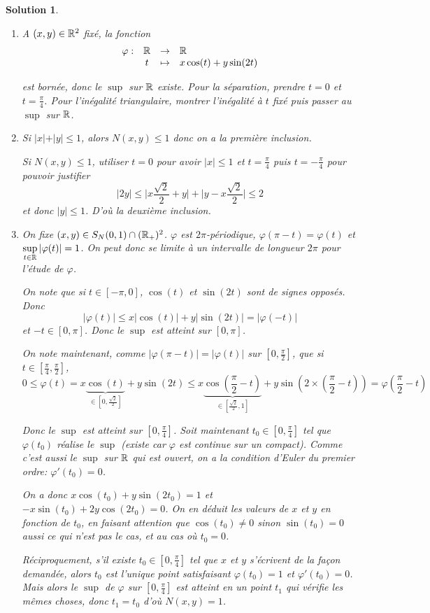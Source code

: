 \documentclass[12pt]{article}
\newtheorem{solution}{Solution}[section]
\theoremstyle{remark}
\newcommand{\function}[5]{
	$$
	\begin{array}{rccl}
		#1: & #2 & \to & #3 \\
		& #4 & \mapsto & #5
	\end{array}
	$$
}
\begin{document}
\begin{solution}
	\phantom{}
	\begin{enumerate}
		\item A $(x,y)\in\mathbb{R}^{2}$ fixé, la fonction \function{\varphi}{\R}{\R}{t}{x\cos(t)+y\sin(2t)}
		est bornée, donc le $\sup$ sur $\mathbb{R}$ existe. Pour la séparation, prendre $t=0$ et $t=\frac{\pi}{4}$. Pour l'inégalité triangulaire, montrer l'inégalité à $t$ fixé puis passer au $\sup$ sur $\mathbb{R}$.
		
		\item Si $\vert x\vert+\vert y\vert\leqslant1$, alors $N(x,y)\leqslant 1$ donc on a la première inclusion. 
		
		Si $N(x,y)\leqslant 1$, utiliser $t=0$ pour avoir $\vert x\vert\leqslant1$ et $t=\frac{\pi}{4}$ puis $t=-\frac{\pi}{4}$ pour pouvoir justifier
		$$\vert 2y\vert\leqslant \Biggl\vert x\frac{\sqrt{2}}{2}+y\Biggr\vert+\Biggl\vert y-x\frac{\sqrt{2}}{2}\Biggr\vert\leqslant 2$$
		et donc $\vert y\vert\leqslant1$. D'où la deuxième inclusion. 

		\item On fixe $(x,y)\in S_{N}(0,1)\cap(\mathbb{R}_{+})^{2}$. $\varphi$ est $2\pi$-périodique, $\varphi(\pi-t)=\varphi(t)$ et $\sup\limits_{t\in\mathbb{R}}\vert\varphi(t)\vert=1$. On peut donc se limite à un intervalle de longueur $2\pi$ pour l'étude de $\varphi$. 
		
		On note que si $t\in[-\pi,0]$, $\cos(t)$ et $\sin(2t)$ sont de signes opposés. Donc
		$$\vert\varphi(t)\vert\leqslant x\vert\cos(t)\vert+y\vert\sin(2t)\vert=\vert\varphi(-t)\vert$$
		et $-t\in[0,\pi]$. Donc le $\sup$ est atteint sur $[0,\pi]$.

		On note maintenant, comme $\vert\varphi(\pi-t)\vert=\vert\varphi(t)\vert$ sur $[0,\frac{\pi}{2}]$, que si $t\in[\frac{\pi}{4},\frac{\pi}{2}]$,
		$$0\leqslant\varphi(t)=x\underbrace{\cos(t)}_{\in[0,\frac{\sqrt{2}}{2}]}+y\sin(2t)\leqslant x\underbrace{\cos(\frac{\pi}{2}-t)}_{\in[\frac{\sqrt{2}}{2},1]}+y\sin(2\times (\frac{\pi}{2}-t))=\varphi(\frac{\pi}{2}-t)$$

		Donc le $\sup$ est atteint sur $[0,\frac{\pi}{4}]$. Soit maintenant $t_{0}\in[0,\frac{\pi}{4}]$ tel que $\varphi(t_{0})$ réalise le $\sup$ (existe car $\varphi$ est continue sur un compact). Comme c'est aussi le $\sup$ sur $\mathbb{R}$ qui est ouvert, on a la condition d'Euler du premier ordre: $\varphi'(t_{0})=0$.

		On a donc $x\cos(t_{0})+y\sin(2t_{0})=1$ et $-x\sin(t_{0})+2y\cos(2t_{0})=0$. On en déduit les valeurs de $x$ et $y$ en fonction de $t_{0}$, en faisant attention que $\cos(t_{0})\neq0$ sinon $\sin(t_{0})=0$ aussi ce qui n'est pas le cas, et au cas où $t_{0}=0$.

		Réciproquement, s'il existe $t_{0}\in[0,\frac{\pi}{4}]$ tel que $x$ et $y$ s'écrivent de la façon demandée, alors $t_{0}$ est l'unique point satisfaisant $\varphi(t_{0})=1$ et $\varphi'(t_{0})=0$. Mais alors le $\sup$ de $\varphi$ sur $[0,\frac{\pi}{4}]$ est atteint en un point $t_{1}$ qui vérifie les mêmes choses, donc $t_{1}=t_{0}$ d'où $N(x,y)=1$.
	\end{enumerate}
\end{solution}
\end{document}
